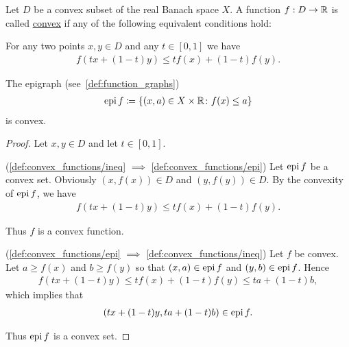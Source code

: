 \begin{definition}\label{def:convex_functions}
  Let $D$ be a convex subset of the real Banach space $X$. A function $f: D \to \mathbb{R}$ is called \uline{convex} if any of the following equivalent conditions hold:

  \begin{defenum}
    \item\label{def:convex_functions/ineq} For any two points $x, y \in D$ and any $t \in [0, 1]$ we have
    \begin{align*}
      f(tx + (1-t)y) \leq tf(x) + (1-t)f(y).
    \end{align*}

    \item\label{def:convex_functions/epi} The epigraph (see~\cref{def:function_graphs})
    \begin{align*}
      \operatorname{epi} f \coloneqq \{ (x, a) \in X \times \mathbb{R} \colon f(x) \leq a \}
    \end{align*}
    is convex.
  \end{defenum}
\end{definition}
\begin{proof}
  Let $x, y \in D$ and let $t \in [0, 1]$.

  (\ref{def:convex_functions/ineq} $\implies$ \ref{def:convex_functions/epi}) Let $\operatorname{epi} f$ be a convex set. Obviously $(x, f(x)) \in D$ and $(y, f(y)) \in D$. By the convexity of $\operatorname{epi} f$, we have
  \begin{align*}
    f(tx + (1-t)y) \leq tf(x) + (1-t)f(y).
  \end{align*}

  Thus $f$ is a convex function.

  (\ref{def:convex_functions/epi} $\implies$ \ref{def:convex_functions/ineq}) Let $f$ be convex. Let $a \geq f(x)$ and $b \geq f(y)$ so that $(x, a) \in \operatorname{epi} f$ and $(y, b) \in \operatorname{epi} f$. Hence
  \begin{align*}
    f(tx + (1-t)y) \leq tf(x) + (1-t)f(y) \leq ta + (1-t)b,
  \end{align*}
  which implies that
  \begin{align*}
    (tx + (1-t)y, ta + (1-t)b) \in \operatorname{epi} f.
  \end{align*}

  Thus $\operatorname{epi} f$ is a convex set.
\end{proof}

